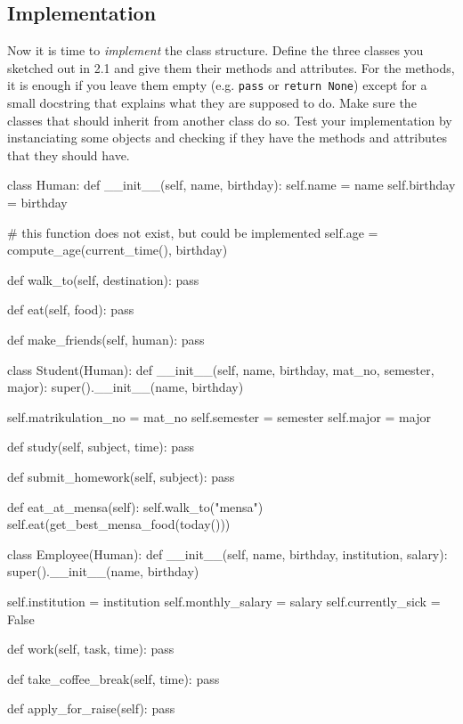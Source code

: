 \subsection{Implementation}

Now it is time to {\it implement} the class structure. Define the three classes you sketched out in 2.1 and give them their methods and attributes. For the methods, it is enough if you leave them empty (e.g. {\tt pass} or {\tt return None}) except for a small docstring that explains what they are supposed to do. Make sure the classes that should inherit from another class do so. Test your implementation by instanciating some objects and checking if they have the methods and attributes that they should have.

\vspace{1em}

\begin{solution}
    \begin{pythoncode}
class Human:
    def __init__(self, name, birthday):
        self.name = name
        self.birthday = birthday

        # this function does not exist, but could be implemented
        self.age = compute_age(current_time(), birthday)

    def walk_to(self, destination):
        pass

    def eat(self, food):
        pass

    def make_friends(self, human):
        pass

class Student(Human):
    def __init__(self, name, birthday, mat_no, semester, major):
        super().__init__(name, birthday)

        self.matrikulation_no = mat_no
        self.semester = semester
        self.major = major

    def study(self, subject, time):
        pass

    def submit_homework(self, subject):
        pass

    def eat_at_mensa(self):
        self.walk_to("mensa")
        self.eat(get_best_mensa_food(today()))

class Employee(Human):
    def __init__(self, name, birthday, institution, salary):
        super().__init__(name, birthday)

        self.institution = institution
        self.monthly_salary = salary
        self.currently_sick = False

    def work(self, task, time):
        pass

    def take_coffee_break(self, time):
        pass

    def apply_for_raise(self):
        pass
    \end{pythoncode}
\end{solution}


